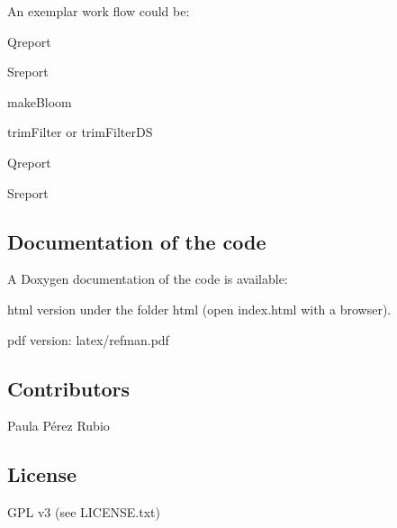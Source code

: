 An exemplar work flow could be\+:


\begin{DoxyItemize}
\item {\ttfamily Qreport}
\item {\ttfamily Sreport}
\item {\ttfamily make\+Bloom}
\item {\ttfamily trim\+Filter} or {\ttfamily trim\+Filter\+DS}
\item {\ttfamily Qreport}
\item {\ttfamily Sreport}
\end{DoxyItemize}

\subsection*{Documentation of the code}

A Doxygen documentation of the code is available\+:
\begin{DoxyItemize}
\item {\ttfamily html} version under the folder {\ttfamily html} (open {\ttfamily index.\+html} with a browser).
\item {\ttfamily pdf} version\+: {\ttfamily latex/refman.\+pdf}
\end{DoxyItemize}

\subsection*{Contributors}

Paula Pérez Rubio

\subsection*{License}

G\+PL v3 (see L\+I\+C\+E\+N\+S\+E.\+txt) 